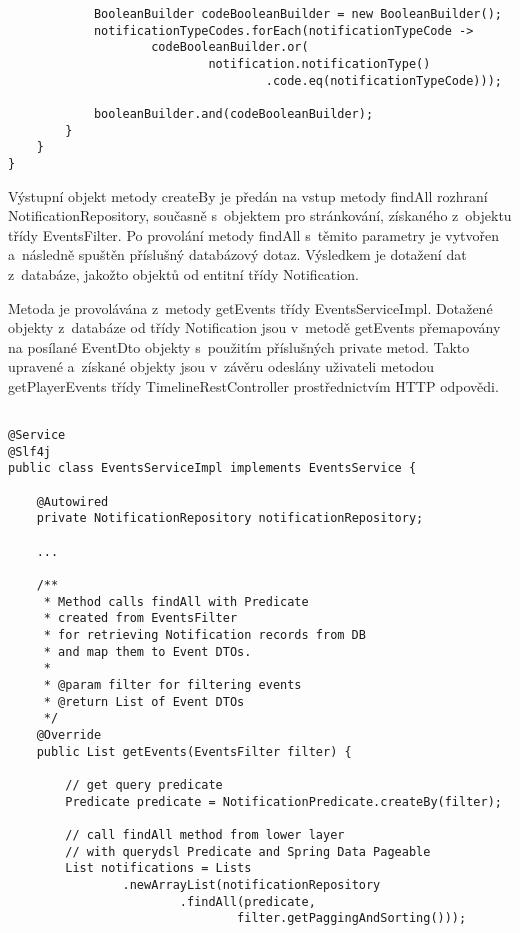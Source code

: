 \documentclass[12pt]{article}
\begin{document}
{\begin{lstlisting}
            BooleanBuilder codeBooleanBuilder = new BooleanBuilder();
            notificationTypeCodes.forEach(notificationTypeCode ->
                    codeBooleanBuilder.or(
                            notification.notificationType()
                                    .code.eq(notificationTypeCode)));

            booleanBuilder.and(codeBooleanBuilder);
        }
    }
}
\end{lstlisting}

Výstupní objekt metody createBy je předán na vstup metody findAll rozhraní NotificationRepository,
současně s~objektem pro stránkování, získaného z~objektu třídy EventsFilter. 
Po provolání metody findAll s~těmito parametry je vytvořen a~následně spuštěn příslušný databázový dotaz.
Výsledkem je dotažení dat z~databáze, jakožto objektů od entitní třídy Notification.

Metoda je provolávána z~metody getEvents třídy EventsServiceImpl.
Dotažené objekty z~databáze od třídy Notification jsou v~metodě getEvents
přemapovány na posílané EventDto objekty s~použitím příslušných private metod.
Takto upravené a~získané objekty jsou v~závěru odeslány uživateli metodou getPlayerEvents
třídy TimelineRestController prostřednictvím HTTP odpovědi.


\clearpage

\begin{lstlisting}

@Service
@Slf4j
public class EventsServiceImpl implements EventsService {

    @Autowired
    private NotificationRepository notificationRepository;
    
    ...
    
    /**
     * Method calls findAll with Predicate
     * created from EventsFilter
     * for retrieving Notification records from DB
     * and map them to Event DTOs.
     *
     * @param filter for filtering events
     * @return List of Event DTOs
     */
    @Override
    public List getEvents(EventsFilter filter) {

        // get query predicate
        Predicate predicate = NotificationPredicate.createBy(filter);

        // call findAll method from lower layer
        // with querydsl Predicate and Spring Data Pageable
        List notifications = Lists
                .newArrayList(notificationRepository
                        .findAll(predicate,
                                filter.getPaggingAndSorting()));


\end{lstlisting}}
\end{document}
